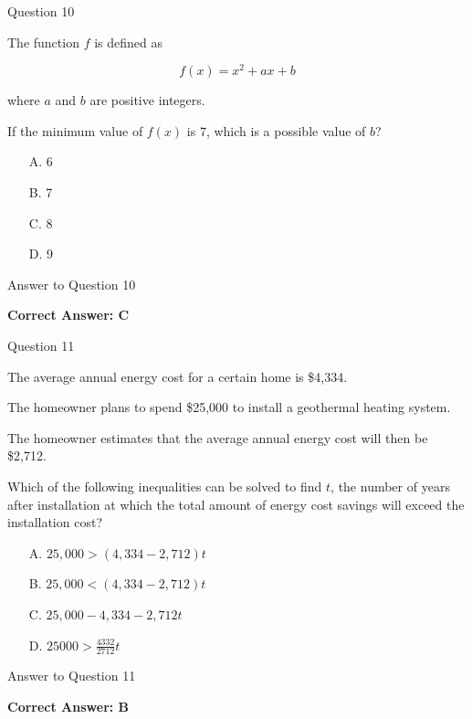 \documentclass{beamer}
\begin{document}
\begin{frame}{Question 10}

The function $f$ is defined as

\[
f(x)=x^2+ax+b
\]

where $a$ and $b$ are positive integers.

If the minimum value of $f(x)$ is $7$, which is a possible value of $b$?

\begin{itemize}
    \item[A.] 6
    \item[B.] 7
    \item[C.] 8
    \item[D.] 9
\end{itemize}

\end{frame}

\begin{frame}{Answer to Question 10}

\textbf{Correct Answer: C}

\end{frame}


\begin{frame}{Question 11}

The average annual energy cost for a certain home is \$4,334.

The homeowner plans to spend \$25,000 to install a geothermal heating system.

The homeowner estimates that the average annual energy cost will then be \$2,712.

Which of the following inequalities can be solved to find $t$, the number of years after installation at which the total amount of energy cost savings will exceed the installation cost?

\begin{itemize}
    \item[A.] $25,000>(4,334-2,712)t$
    \item[B.] $25,000<(4,334-2,712)t$
    \item[C.] $25,000-4,334-2,712t$
    \item[D.]  $25000>\frac{4332}{2712}t$
\end{itemize}

\end{frame}

\begin{frame}{Answer to Question 11}

\textbf{Correct Answer: B}

\end{frame}
\end{document}

